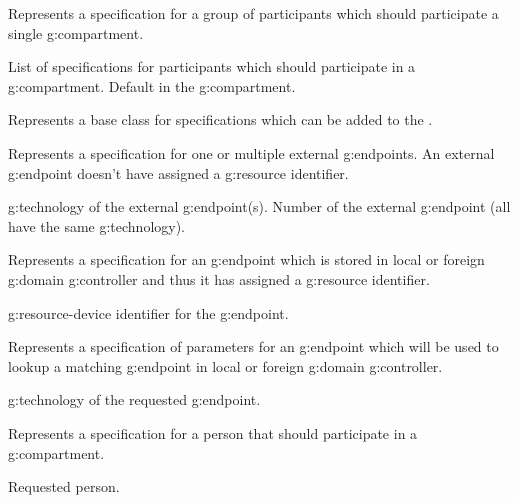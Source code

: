 \begin{Api}
Represents a specification for a group of participants which should participate a single \gls{g:compartment}.
\begin{ApiClassAttributes}
 List of specifications for participants which should participate in a \gls{g:compartment}.
 Default  in the \gls{g:compartment}.
\end{ApiClassAttributes}

Represents a base class for specifications which can be added to the .

Represents a specification for one or multiple external \glspl{g:endpoint}. An external \gls{g:endpoint} doesn't have assigned a \gls{g:resource} identifier.
\begin{ApiClassAttributes}
 \Gls{g:technology} of the external \gls{g:endpoint}(s).
 Number of the external \gls{g:endpoint} (all have the same \gls{g:technology}).
\end{ApiClassAttributes}

Represents a specification for an \gls{g:endpoint} which is stored in local or foreign \gls{g:domain} \gls{g:controller} and thus it has assigned a \gls{g:resource} identifier.
\begin{ApiClassAttributes}
 \Gls{g:resource-device} identifier for the \gls{g:endpoint}.
\end{ApiClassAttributes}

Represents a specification of parameters for an \gls{g:endpoint} which will be used to lookup a matching \gls{g:endpoint} in local or foreign \gls{g:domain} \gls{g:controller}.
\begin{ApiClassAttributes}
 \Gls{g:technology} of the requested \gls{g:endpoint}.
\end{ApiClassAttributes}

Represents a specification for a person that should participate in a \gls{g:compartment}.
\begin{ApiClassAttributes}
 Requested person.
\end{ApiClassAttributes}


\end{Api}
